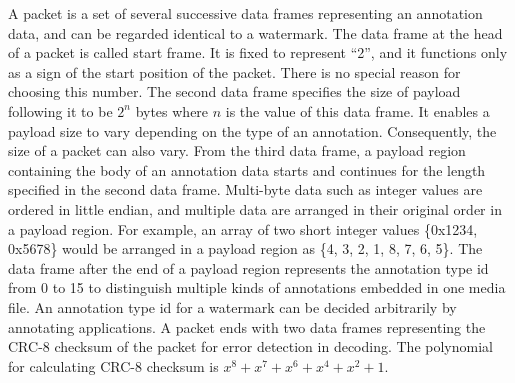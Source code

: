 A packet is a set of several successive data frames representing an annotation data, and can be regarded identical to a watermark.
The data frame at the head of a packet is called start frame. It is fixed to represent ``2'', and it functions only as a sign of the start position of the packet. There is no special reason for choosing this number.
The second data frame specifies the size of payload following it to be $ 2^n $ bytes where $n$ is the value of this data frame. It enables a payload size to vary depending on the type of an annotation. Consequently, the size of a packet can also vary.
From the third data frame, a payload region containing the body of an annotation data starts and continues for the length specified in the second data frame.
Multi-byte data such as integer values are ordered in little endian, and multiple data are arranged in their original order in a payload region.
For example, an array of two short integer values \{0x1234, 0x5678\} would be arranged in a payload region as \{4, 3, 2, 1, 8, 7, 6, 5\}.
The data frame after the end of a payload region represents the annotation type id from 0 to 15 to distinguish multiple kinds of annotations embedded in one media file.
An annotation type id for a watermark can be decided arbitrarily by annotating applications.
A packet ends with two data frames representing the CRC-8 checksum of the packet for error detection in decoding. The polynomial for calculating CRC-8 checksum is $x^8 + x^7 + x^6 + x^4 + x^2 + 1$.

